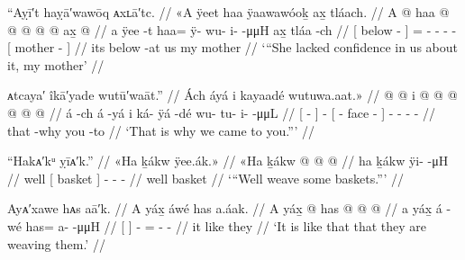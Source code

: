 \ex\label{ex:92-153-lack-confidence-mother}%
%
\begingl
	\glpreamble	“Aỵī′t haỵā′wawōq ᴀxʟā′tc. //
	\glpreamble	«\!A ÿeet haa ÿaawawóoḵ ax̱ tláach. //
	\gla	{} A  @ {} {}
		haa @  @ {} @ {} @ {} @ {}
		{} ax̱  @ {} {} //
	\glb	{} a ÿee -t {}
		haa= ÿ- wu- i-  -μμH
		{} ax̱ tláa -ch {} //
	\glc	{}[  below - {}]
		= - - -   -
		{}[  mother - {}] //
	\gld	{} its below -at {}
		us  {} {} {} {}
		{} my mother {} {} //
	\glft	‘“She lacked confidence in us about it, my mother’
		//
\endgl
\xe

\ex\label{ex:92-154-thats-why-came-to-you}%
%
\begingl
	\glpreamble	ᴀtcaya′ îkā′yade wutū′waāt.” //
	\glpreamble	Ách áyá i kayaadé wutuwa.aat.\!» //
	\gla	{}  @ {} {}  @ {}
		{} i  @ {} @ {} {}
		 @ {} @ {} @ {} @ {} //
	\glb	{} á -ch {} á -yá
		{} i ká- ÿá -dé {}
		wu- tu- i-  -μμL //
	\glc	{}[  - {}]  -
		{}[  - face - {}]
		- - -  - //
	\gld	{} that -why {}  {}
		{} you {} {} -to {}
		 {} {} {} {} //
	\glft	‘That is why we came to you.”’
		//
\endgl
\xe

\ex\label{ex:92-155-weave-baskets}%
%
\begingl
	\glpreamble	“Hakᴀ′kᵘ ỵīᴀ′k.” //
	\glpreamble	«\!Ha ḵákw ÿee.ák.\!» //
	\gla	«\!Ha {} ḵákw {}  @ {} @ {} @ {} //
	\glb	\pqp{}ha {} ḵákw {} {} ÿi-  -μH //
	\glc	\pqp{}well {}[ basket {}]
		- -  - //
	\gld	\pqp{}well {} basket {}  {} {} {} //
	\glft	‘“Well weave some baskets.”’
		//
\endgl
\xe

\ex\label{ex:92-156-like-that-weaving-them}%
%
\begingl
	\glpreamble	Ayᴀ′xawe hᴀs aā′k. //
	\glpreamble	A yáx̱ áwé has a.áak. //
	\gla	{} A yáx̱ {}  @ {}
		has @  @ {} @ {} //
	\glb	{} a yáx̱ {} á -wé
		has= a-  -μμH //
	\glc	{}[   {}]  -
		= -  - //
	\gld	{} it like {}  {}
		they  {} {} //
	\glft	‘It is like that that they are weaving them.’
		//
\endgl
\xe

